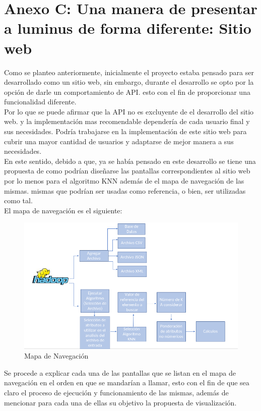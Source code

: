\section{Anexo C: Una manera de presentar a luminus de forma diferente: Sitio web}\label{sitioweb}
Como se planteo anteriormente, inicialmente el proyecto estaba pensado para ser desarrollado como un sitio web, sin embargo, durante el desarrollo se opto por la opción de darle un comportamiento de API. esto con el fin de proporcionar una funcionalidad diferente. \\
Por lo que se puede afirmar que la API no es excluyente de el desarrollo del sitio web. y la implementación mas recomendable dependería de cada usuario final y sus necesidades. Podría trabajarse en la implementación de este sitio web para cubrir una mayor cantidad de usuarios y adaptarse de mejor manera a sus necesidades.\\
En este sentido, debido a que, ya se había pensado en este desarrollo se tiene una propuesta de como podrían diseñarse las pantallas correspondientes al sitio web por lo menos para el algoritmo KNN además de el mapa de navegación de las mismas. mismas que podrían ser usadas como referencia, o bien, ser utilizadas como tal.\\
El mapa de navegación es el siguiente:\\
\begin{figure}[!htbp]
	\hypertarget{fig:red}{\hspace{1pt}}
	\begin{center}
		\includegraphics[width=.9\textwidth]{capitulo7/images/mapadenavegacion.png}
		\caption{Mapa de Navegación}
		\label{fig:mapanav}
	\end{center}
\end{figure}
\newpage
Se procede a explicar cada una de las pantallas que se listan en el mapa de navegación en el orden en que se mandarían a llamar, esto con el fin de que sea claro el proceso de ejecución y funcionamiento de las mismas, además de mencionar para cada una de ellas su objetivo la propuesta de visualización.\\

